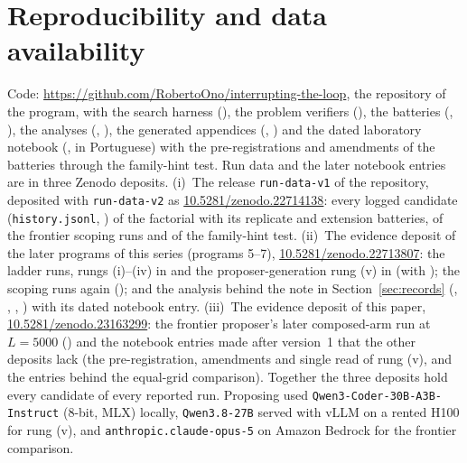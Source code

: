 \documentclass[11pt]{article}
\newcommand{\evidencedoi}{10.5281/zenodo.23163299}
\begin{document}
\appendix
\section{Reproducibility and data availability}
\label{app:repro}

\begin{sloppypar}
Code: \url{https://github.com/RobertoOno/interrupting-the-loop}, the
repository of the program, with the search
harness (), the problem verifiers
(), the batteries
(, ), the analyses
(, ), the
generated appendices (,
) and the dated laboratory notebook
(, in Portuguese) with the pre-registrations and
amendments of the batteries through the family-hint test. Run data and
the later notebook entries are in three Zenodo deposits.
(i)~The release \texttt{run-data-v1} of the repository, deposited with
\texttt{run-data-v2} as
\href{https://doi.org/10.5281/zenodo.22714138}{10.5281/zenodo.22714138}:
every logged candidate (\texttt{history.jsonl}, ) of the
factorial with its replicate and extension batteries, of the frontier
scoping runs and of the family-hint test.
(ii)~The evidence deposit of the later programs of this series
(programs 5--7),
\href{https://doi.org/10.5281/zenodo.22713807}{10.5281/zenodo.22713807}:
the ladder runs, rungs (i)--(iv) in  and
the proposer-generation rung (v) in 
(with ); the scoping runs again
(); and the analysis behind the note in
Section~\ref{sec:records} (,
, ,
) with its dated notebook entry.
(iii)~The evidence deposit of this paper,
\href{https://doi.org/\evidencedoi}{\evidencedoi}: the frontier
proposer's later composed-arm run at $L{=}5000$
() and the notebook entries
made after version~1 that the other deposits lack (the pre-registration,
amendments and single read of rung (v), and the entries behind the
equal-grid comparison). Together the three deposits hold every
candidate of every reported run. Proposing used
\texttt{Qwen3-Coder-30B-A3B-Instruct} (8-bit, MLX) locally,
\texttt{Qwen3.8-27B} served with vLLM on a rented H100 for rung (v),
and \texttt{anthropic.claude-opus-5} on Amazon Bedrock for the frontier
comparison.
\end{sloppypar}



\end{document}
